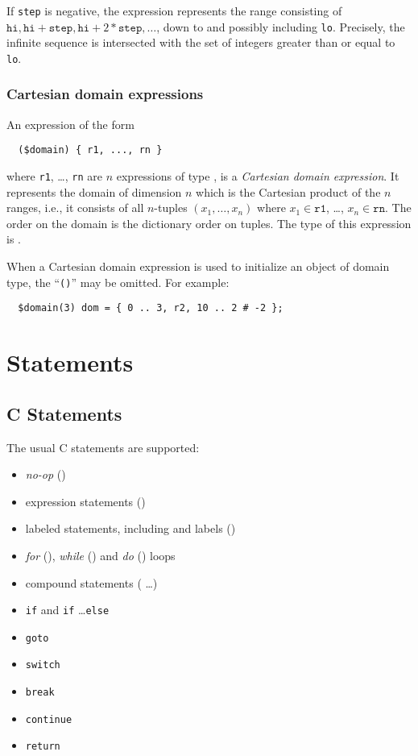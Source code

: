 If \texttt{step} is negative, the expression represents the range
consisting of $\texttt{hi}, \texttt{hi}+\texttt{step},
\texttt{hi}+2*\texttt{step}, \ldots$, down to and possibly including
\texttt{lo}.  Precisely, the infinite sequence is intersected with the
set of integers greater than or equal to \texttt{lo}.

\subsubsection{Cartesian domain expressions}
\label{sec:domain_expr}

An expression of the form
\begin{verbatim}
  ($domain) { r1, ..., rn }
\end{verbatim}
where \texttt{r1}, \ldots, \texttt{rn} are $n$ expressions of type
\crange, is a \emph{Cartesian domain expression}.  It represents the
domain of dimension $n$ which is the Cartesian product of the $n$
ranges, i.e., it consists of all $n$-tuples $(x_1,\ldots,x_n)$ where
$x_1\in\texttt{r1}$, \ldots, $x_n\in\texttt{rn}$.  The order on the
domain is the dictionary order on tuples.  The type of this expression
is .

When a Cartesian domain expression is used to initialize an object of
domain type, the ``\texttt{(}\cdomain\texttt{)}'' may be omitted.
For example:
\begin{verbatim}
  $domain(3) dom = { 0 .. 3, r2, 10 .. 2 # -2 };
\end{verbatim}


\section{Statements}

\subsection{C Statements}

The usual C statements are supported:
\begin{itemize}
\item \emph{no-op} (\ct{;})
\item expression statements ()
\item labeled statements, including  and  labels
  ()
\item \emph{for} (), \emph{while} 
  () and \emph{do} ()
  loops
\item compound statements (\lb {} \ldots \rb)
\item \texttt{if} and \verb!if! \ldots \verb!else!
\item \verb!goto!
\item \verb!switch!
\item \verb!break!
\item \verb!continue!
\item \verb!return!
\end{itemize}

